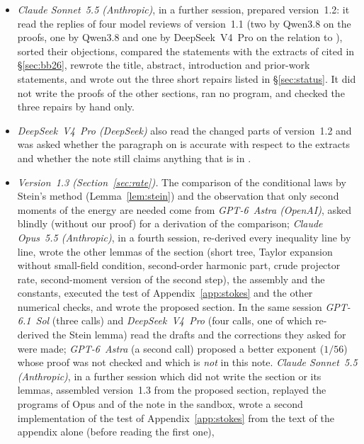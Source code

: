 \documentclass[11pt,a4paper]{article}
\theoremstyle{plain}
\theoremstyle{definition}
\theoremstyle{remark}
\numberwithin{equation}{section}
\begin{document}
\begin{itemize}
and normaliser bounds, the square-sweep induction, exact energy counts and the full Caccioppoli averaging constant.
It re-read its own earlier arguments; this is an author-side mathematical audit, not an independent review or a formal verification.
\item \emph{Claude Sonnet~5.5 (Anthropic)}, in a further session, prepared version~1.2: it read the replies of four model reviews of version~1.1 (two by Qwen3.8 on the proofs, one by Qwen3.8 and one by DeepSeek~V4~Pro on the relation to \cite{BB26}),
sorted their objections, compared the statements with the extracts of \cite{BB26} cited in \S\ref{sec:bb26}, rewrote the title, abstract, introduction and prior-work statements, and wrote out the three short repairs listed in \S\ref{sec:status}.
It did not write the proofs of the other sections, ran no program, and checked the three repairs by hand only.
\item \emph{DeepSeek~V4~Pro (DeepSeek)} also read the changed parts of version~1.2 and was asked whether the paragraph on \cite{BB26} is accurate with respect to the extracts and whether the note still claims anything that is in \cite{BB26}.
\item \emph{Version~1.3 (Section~\ref{sec:rate}).} The comparison of the conditional laws by Stein's method (Lemma~\ref{lem:stein}) and the observation that only second moments of the energy are needed come from
\emph{GPT-6~Astra (OpenAI)}, asked blindly (without our proof) for a derivation of the comparison; \emph{Claude Opus~5.5 (Anthropic)}, in a fourth session, re-derived every inequality line by line,
wrote the other lemmas of the section (short tree, Taylor expansion without small-field condition, second-order harmonic part, crude projector rate, second-moment version of the second step), the assembly and the constants, executed
the test of Appendix~\ref{app:stokes} and the other numerical checks, and wrote the proposed section. In the same session \emph{GPT-6.1~Sol} (three calls) and \emph{DeepSeek~V4~Pro} (four calls, one of which re-derived the Stein lemma) read the drafts and the corrections they asked for were made;
\emph{GPT-6~Astra} (a second call) proposed a better exponent ($1/56$) whose proof was not checked and which is \emph{not} in this note.
\emph{Claude Sonnet~5.5 (Anthropic)}, in a further session which did not write the section or its lemmas, assembled version~1.3 from the proposed section, replayed the programs of Opus and of the note in the sandbox, wrote a second implementation of the test of Appendix~\ref{app:stokes} from the text of the appendix alone (before reading the first one),

\end{itemize}
\end{document}
